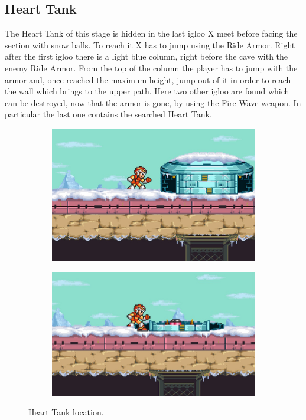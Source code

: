 \subsection{Heart Tank}\label{Penguin:heart_tank}
The Heart Tank of this stage is hidden in the last igloo X meet before facing the section with snow balls. To reach it X has to jump using the Ride Armor. Right after the first igloo there is a light blue column, right before the cave with the enemy Ride Armor. From the top of the column the player has to jump with the armor and, once reached the maximum height, jump out of it in order to reach the wall which brings to the upper path. Here two other igloo are found which can be destroyed, now that the armor is gone, by using the Fire Wave weapon. In particular the last one contains the searched Heart Tank.
\begin{figure}[htp]
	\centering
	\begin{subfigure}{0.375\linewidth}
		\centering
		\includegraphics[width=\textwidth]{figures/X1/Chill_penguin/Chill_heart_1.jpg}	
		\caption{}
	\end{subfigure}
	\begin{subfigure}{0.4\linewidth}
		\centering
		\includegraphics[width=\textwidth]{figures/X1/Chill_penguin/Chill_heart_2.jpg}	
		\caption{}
	\end{subfigure}
	\caption{Heart Tank location.}
\end{figure}

